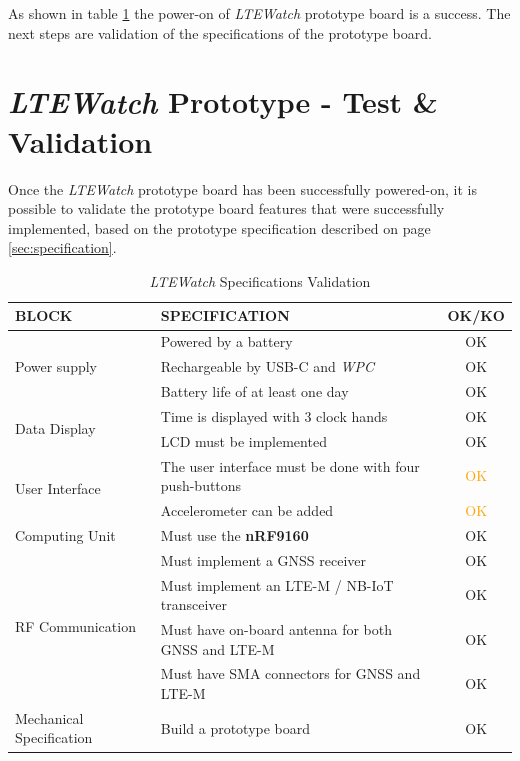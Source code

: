 \documentclass[Report.tex]{subfiles}
\begin{document}
As shown in table \ref{tab:poweron_tab} the power-on of \textit{LTEWatch} prototype board is a success. The next steps are validation of the specifications of the prototype board.

\pagebreak

\section{\textit{LTEWatch} Prototype - Test \& Validation}
Once the \textit{LTEWatch} prototype board has been successfully powered-on, it is possible to validate the prototype board features that were successfully implemented, based on the prototype specification described on page \ref{sec:specification}.

\begin{table}[H]
\centering
\begin{tabularx}{\textwidth}{|l|X|c|}
\hline
\textbf{BLOCK} & \textbf{SPECIFICATION}  &\textbf{OK/KO} \\\hline
\multirow{3}{*}{Power supply} & Powered by a battery  & \textcolor{mygreen}{OK} \\\cline{2-3}
 & Rechargeable by USB-C and \textit{WPC}  & \textcolor{mygreen}{OK} \\\cline{2-3}
  & Battery life of at least one day  & \textcolor{mygreen}{OK} \\\hline
\multirow{2}{*}{Data Display} & Time is displayed with 3 clock hands & \textcolor{mygreen}{OK} \\\cline{2-3}
  & LCD must be implemented & \textcolor{mygreen}{OK} \\\hline
\multirow{2}{*}{User Interface}  & The user interface must be done with four push-buttons & \textcolor{orange}{OK} \\\cline{2-3}
 & Accelerometer can be added & \textcolor{orange}{OK} \\\hline
Computing Unit & Must use the \textbf{nRF9160} & \textcolor{mygreen}{OK} \\\hline
\multirow{4}{*}{RF Communication} & Must implement a GNSS receiver & \textcolor{mygreen}{OK} \\\cline{2-3}
 & Must implement an LTE-M / NB-IoT transceiver & \textcolor{mygreen}{OK} \\\cline{2-3}
  & Must have on-board antenna for both GNSS and LTE-M & \textcolor{mygreen}{OK} \\\cline{2-3}
   & Must have SMA connectors for GNSS and LTE-M & \textcolor{mygreen}{OK} \\\hline
Mechanical Specification & Build a prototype board & \textcolor{mygreen}{OK} \\\hline
\end{tabularx}
\caption{\textit{LTEWatch} Specifications Validation}
\label{tab:poweron_tab}
\end{table}
\end{document}
